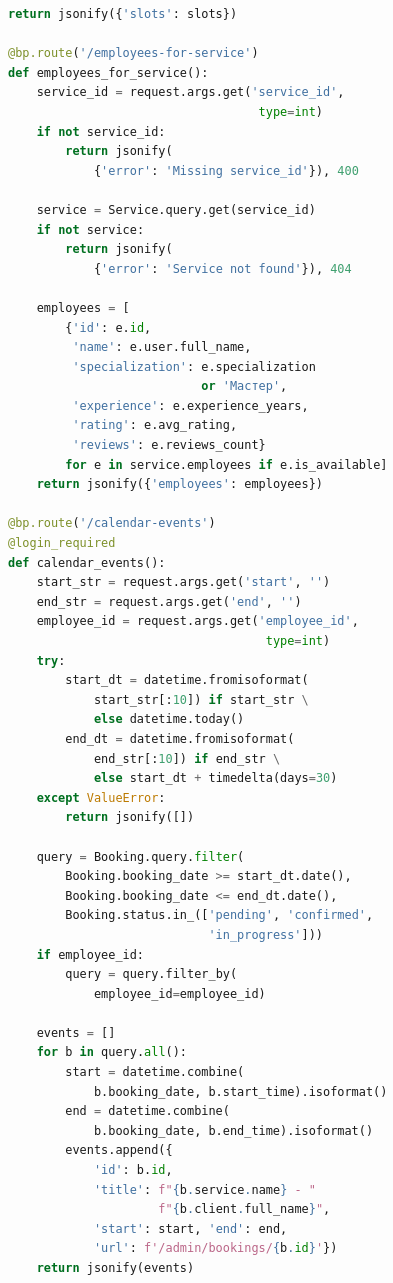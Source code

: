 \documentclass[14pt,a4paper,oneside]{extarticle}
\begin{document}
\begin{lstlisting}[language=Python, caption={REST API маршруты (app/api/routes.py)}, label={lst:full_api}]
    return jsonify({'slots': slots})

@bp.route('/employees-for-service')
def employees_for_service():
    service_id = request.args.get('service_id',
                                   type=int)
    if not service_id:
        return jsonify(
            {'error': 'Missing service_id'}), 400

    service = Service.query.get(service_id)
    if not service:
        return jsonify(
            {'error': 'Service not found'}), 404

    employees = [
        {'id': e.id,
         'name': e.user.full_name,
         'specialization': e.specialization
                           or 'Мастер',
         'experience': e.experience_years,
         'rating': e.avg_rating,
         'reviews': e.reviews_count}
        for e in service.employees if e.is_available]
    return jsonify({'employees': employees})

@bp.route('/calendar-events')
@login_required
def calendar_events():
    start_str = request.args.get('start', '')
    end_str = request.args.get('end', '')
    employee_id = request.args.get('employee_id',
                                    type=int)
    try:
        start_dt = datetime.fromisoformat(
            start_str[:10]) if start_str \
            else datetime.today()
        end_dt = datetime.fromisoformat(
            end_str[:10]) if end_str \
            else start_dt + timedelta(days=30)
    except ValueError:
        return jsonify([])

    query = Booking.query.filter(
        Booking.booking_date >= start_dt.date(),
        Booking.booking_date <= end_dt.date(),
        Booking.status.in_(['pending', 'confirmed',
                            'in_progress']))
    if employee_id:
        query = query.filter_by(
            employee_id=employee_id)

    events = []
    for b in query.all():
        start = datetime.combine(
            b.booking_date, b.start_time).isoformat()
        end = datetime.combine(
            b.booking_date, b.end_time).isoformat()
        events.append({
            'id': b.id,
            'title': f"{b.service.name} - "
                     f"{b.client.full_name}",
            'start': start, 'end': end,
            'url': f'/admin/bookings/{b.id}'})
    return jsonify(events)
\end{lstlisting}
\end{document}
